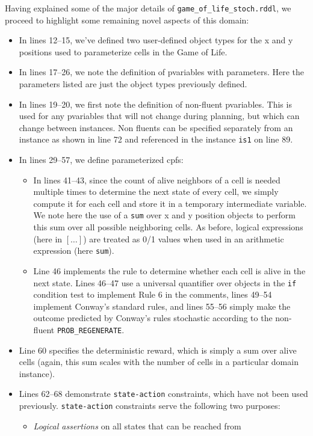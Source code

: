 \documentclass[11pt,a4paper]{article}
\begin{document}
Having explained some of the major details of
\texttt{game\_of\_life\_stoch.rddl}, we proceed to highlight some
remaining novel aspects of this domain:
\begin{itemize}  
\item In lines 12--15, we've defined two user-defined object
types for the x and y positions used to parameterize
cells in the Game of Life.
\item In lines 17--26, we note the definition of pvariables
with parameters.  Here the parameters listed are just the
object types previously defined.
\item In lines 19--20, we first note the definition of non-fluent
pvariables.  This is used for any pvariables that will not change
during planning, but which can change between instances.
Non fluents can be specified separately from an instance
as shown in line 72 and referenced in the instance \texttt{is1}
on line 89.
\item In lines 29--57, we define parameterized cpfs:
\begin{itemize}
\item In lines 41--43, since the count of alive neighbors of a
cell is needed multiple times to determine the next state of
every cell, we simply compute it for each cell and store it
in a temporary intermediate variable.  We note here the use
of a \texttt{sum} over x and y position objects to perform
this sum over all possible neighboring cells.  As before,
logical expressions (here in $[\ldots]$) are treated as 0/1
values when used in an arithmetic expression (here \texttt{sum}).
\item Line 46 implements the rule to determine whether each cell is
alive in the next state.  Lines 46--47 use a universal quantifier over
objects in the \texttt{if} condition test to implement Rule 6 in the
comments, lines 49--54 implement Conway's standard rules, and lines
55--56 simply make the outcome predicted by Conway's rules stochastic
according to the non-fluent \texttt{PROB\_REGENERATE}.
\end{itemize}
\item Line 60 specifies the deterministic reward, which is simply
a sum over alive cells (again, this sum scales with the number
of cells in a particular domain instance).
\item Lines 62--68 demonstrate \texttt{state-action} constraints,
which have not been used previously.  \texttt{state-action} constraints
serve the following two purposes:
\begin{itemize}
\item \emph{Logical assertions} on all states that can be reached from

\end{itemize}
\end{itemize}
\end{document}
